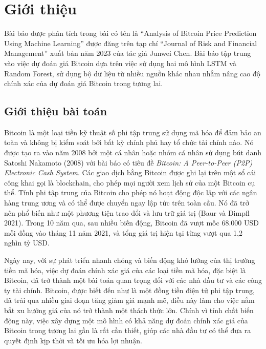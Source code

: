 
\chapter{Giới thiệu}

Bài báo được phân tích trong bài có tên là “Analysis of Bitcoin Price Prediction Using Machine Learning” được đăng trên tạp chí “Journal of Risk and Financial Management” xuất bản năm 2023 của tác giả Junwei Chen. Bài báo tập trung vào việc dự đoán giá Bitcoin dựa trên việc sử dụng hai mô hình LSTM và Random Forest, sử dụng bộ dữ liệu từ nhiều nguồn khác nhau nhằm nâng cao độ chính xác của dự đoán giá Bitcoin trong tương lai.

\section{Giới thiệu bài toán}

Bitcoin là một loại tiền kỹ thuật số phi tập trung sử dụng mã hóa để đảm bảo an toàn và không bị kiểm soát bởi bất kỳ chính phủ hay tổ chức tài chính nào. Nó được tạo ra vào năm 2008 bởi một cá nhân hoặc nhóm cá nhân sử dụng bút danh Satoshi Nakamoto (2008) với bài báo có tiêu đề \textit{Bitcoin: A Peer-to-Peer (P2P) Electronic Cash System}. Các giao dịch bằng Bitcoin được ghi lại trên một sổ cái công khai gọi là blockchain, cho phép mọi người xem lịch sử của một Bitcoin cụ thể. Tính phi tập trung của Bitcoin cho phép nó hoạt động độc lập với các ngân hàng trung ương và có thể được chuyển ngay lập tức trên toàn cầu. Nó đã trở nên phổ biến như một phương tiện trao đổi và lưu trữ giá trị (Baur và Dimpfl 2021). Trong 10 năm qua, sau nhiều biến động, Bitcoin đã vượt mốc 68.000 USD mỗi đồng vào tháng 11 năm 2021, và tổng giá trị hiện tại từng vượt qua 1,2 nghìn tỷ USD.

Ngày nay, với sự phát triển nhanh chóng và biến động khó lường của thị trường tiền mã hóa, việc dự đoán chính xác giá của các loại tiền mã hóa, đặc biệt là Bitcoin, đã trở thành một bài toán quan trọng đối với các nhà đầu tư và các công ty tài chính. Bitcoin, được biết đến như là một đồng tiền điện tử phi tập trung, đã trải qua nhiều giai đoạn tăng giảm giá mạnh mẽ, điều này làm cho việc nắm bắt xu hướng giá của nó trở thành một thách thức lớn. Chính vì tính chất biến động này, việc xây dựng một mô hình có khả năng dự đoán chính xác giá của Bitcoin trong tương lai gần là rất cần thiết, giúp các nhà đầu tư có thể đưa ra quyết định kịp thời và tối ưu hóa lợi nhuận.

